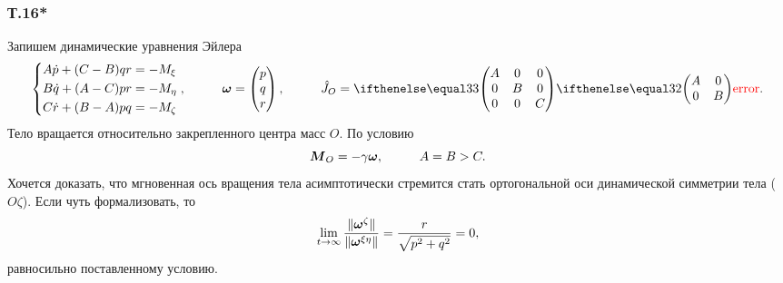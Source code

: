 \subsubsection*{Т.16*}


Запишем динамические уравнения Эйлера
\begin{equation}
    \left\{\begin{aligned}
        A \dot{p} + (C-B) q r &= - M_{\xi} \\
        B \dot{q} + (A-C) p r &= - M_{\eta} \\
        C \dot{r} + (B-A) p q &= - M_{\zeta} \\
    \end{aligned}\right.,
    \hspace{1cm} 
    \vc{\omega} = \begin{pmatrix}
        p \\ q \\ r
    \end{pmatrix}, 
    \hspace{1cm} 
    \hat{J}_O = \dmat{3}{A}{B}{C}.
\end{equation}
Тело вращается относительно закрепленного центра масс $O$. По условию
\begin{equation*}
    \mbox{\boldmath $M$}_O = - \gamma \mbox{\boldmath $\omega$},
    \hspace{1cm} 
    A = B > C.
\end{equation*}
Хочется доказать, что мгновенная ось вращения тела асимптотически стремится стать ортогональной оси динамической симметрии тела ($O\zeta$). Если чуть формализовать, то 
\begin{equation}
\label{lim}
    \lim_{t \to \infty} \frac{\|\mbox{\boldmath $\omega$}^{\zeta}\|}{\|\mbox{\boldmath $\omega$}^{\xi\eta}\|} = \frac{r}{\sqrt{p^2+q^2}} = 0,
\end{equation}
равносильно поставленному условию.

